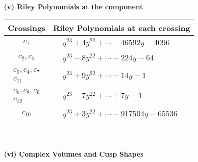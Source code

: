 \documentclass[1p]{elsarticle_modified}
\theoremstyle{definition}
\begin{document}
\newpage\renewcommand{\arraystretch}{1}
\flushleft \textbf{(v) Riley Polynomials at the component}\newline \\
\begin{tabular}{m{50pt}|m{274pt}}
Crossings & \hspace{64pt}Riley Polynomials at each crossing \\
\hline $$\begin{aligned}c_{1}\end{aligned}$$&$\begin{aligned}
&y^{23}+4 y^{22}+\cdots-46592 y-4096
\end{aligned}$\\
\hline $$\begin{aligned}c_{2},c_{5}\end{aligned}$$&$\begin{aligned}
&y^{23}-8 y^{22}+\cdots+224 y-64
\end{aligned}$\\
\hline $$\begin{aligned}c_{3},c_{4},c_{7}\\c_{11}\end{aligned}$$&$\begin{aligned}
&y^{23}+9 y^{22}+\cdots-14 y-1
\end{aligned}$\\
\hline $$\begin{aligned}c_{6},c_{8},c_{9}\\c_{12}\end{aligned}$$&$\begin{aligned}
&y^{23}-7 y^{22}+\cdots+7 y-1
\end{aligned}$\\
\hline $$\begin{aligned}c_{10}\end{aligned}$$&$\begin{aligned}
&y^{23}+3 y^{22}+\cdots-917504 y-65536
\end{aligned}$\\
\hline
\end{tabular}\\~\\
\newpage\flushleft \textbf{(vi) Complex Volumes and Cusp Shapes}
\end{document}
